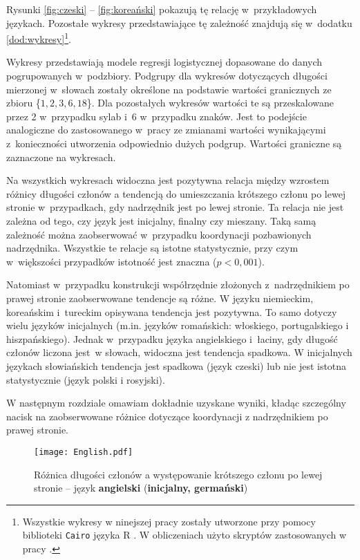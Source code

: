 Rysunki \ref{fig:czeski} -- \ref{fig:koreański} pokazują tę relację w~przykładowych językach. Pozostałe wykresy przedstawiające tę zależność znajdują się w~dodatku \ref{dod:wykresy}\footnote{
Wszystkie wykresy w ninejszej pracy zostały utworzone przy pomocy biblioteki \texttt{Cairo} języka R \citep{R2023}. W obliczeniach użyto skryptów zastosowanych w pracy \cite{przepiorkowski2023conjunct}.}.

Wykresy przedstawiają modele regresji logistycznej dopasowane do danych pogrupowanych w~podzbiory. Podgrupy dla wykresów dotyczących długości mierzonej w~słowach zostały określone na podstawie wartości granicznych ze zbioru \{$1, 2, 3, 6, 18$\}. Dla pozostałych wykresów wartości te są przeskalowane przez 2 w~przypadku sylab i~6 w~przypadku znaków. Jest to podejście analogiczne do zastosowanego w~pracy \cite{przepiorkowski2023conjunct} ze zmianami wartości wynikającymi z~konieczności utworzenia odpowiednio dużych podgrup. Wartości graniczne są zaznaczone na wykresach. 

Na wszystkich wykresach widoczna jest pozytywna relacja między wzrostem różnicy długości członów a tendencją do umieszczania krótszego członu po lewej stronie w~przypadkach, gdy nadrzędnik jest po lewej stronie. Ta relacja nie jest zależna od tego, czy język jest inicjalny, finalny czy mieszany. Taką samą zależność można zaobserwować w~przypadku koordynacji pozbawionych nadrzędnika. Wszystkie te relacje są istotne statystycznie, przy czym w~większości przypadków istotność jest znaczna ($p<0,001$).

Natomiast w~przypadku konstrukcji współrzędnie złożonych z~nadrzędnikiem po prawej stronie zaobserwowane tendencje są różne. W języku niemieckim, koreańskim i~tureckim opisywana tendencja jest pozytywna. To samo dotyczy wielu języków inicjalnych (m.in. języków romańskich: włoskiego,  portugalskiego i hiszpańskiego). Jednak w~przypadku języka angielskiego i~łaciny, gdy długość członów liczona jest~w słowach, widoczna jest tendencja spadkowa. W inicjalnych językach słowiańskich tendencja jest spadkowa (język czeski) lub nie jest istotna statystycznie (język polski i rosyjski). 

W następnym rozdziale omawiam dokładnie uzyskane wyniki, kładąc szczególny nacisk na zaobserwowane różnice dotyczące koordynacji z nadrzędnikiem po prawej stronie.

\graphicspath{{results/plots}}

\begin{sidewaysfigure}
\centering
\texttt{[image: English.pdf]}
\caption{Różnica długości członów a występowanie krótszego członu po lewej stronie -- język \textbf{angielski} (\textbf{inicjalny, germański})}
\label{fig:angielski}
\end{sidewaysfigure}

